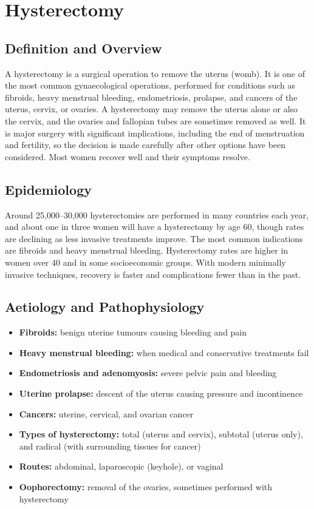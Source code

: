 \chapter{Hysterectomy}

\section*{Definition and Overview}
A hysterectomy is a surgical operation to remove the uterus (womb). It is one of the most common gynaecological operations, performed for conditions such as fibroids, heavy menstrual bleeding, endometriosis, prolapse, and cancers of the uterus, cervix, or ovaries. A hysterectomy may remove the uterus alone or also the cervix, and the ovaries and fallopian tubes are sometimes removed as well. It is major surgery with significant implications, including the end of menstruation and fertility, so the decision is made carefully after other options have been considered. Most women recover well and their symptoms resolve.

\section*{Epidemiology}
Around 25,000--30,000 hysterectomies are performed in many countries each year, and about one in three women will have a hysterectomy by age 60, though rates are declining as less invasive treatments improve. The most common indications are fibroids and heavy menstrual bleeding. Hysterectomy rates are higher in women over 40 and in some socioeconomic groups. With modern minimally invasive techniques, recovery is faster and complications fewer than in the past.

\section*{Aetiology and Pathophysiology}
\begin{itemize}
    \item \textbf{Fibroids:} benign uterine tumours causing bleeding and pain
    \item \textbf{Heavy menstrual bleeding:} when medical and conservative treatments fail
    \item \textbf{Endometriosis and adenomyosis:} severe pelvic pain and bleeding
    \item \textbf{Uterine prolapse:} descent of the uterus causing pressure and incontinence
    \item \textbf{Cancers:} uterine, cervical, and ovarian cancer
    \item \textbf{Types of hysterectomy:} total (uterus and cervix), subtotal (uterus only), and radical (with surrounding tissues for cancer)
    \item \textbf{Routes:} abdominal, laparoscopic (keyhole), or vaginal
    \item \textbf{Oophorectomy:} removal of the ovaries, sometimes performed with hysterectomy
\end{itemize}

